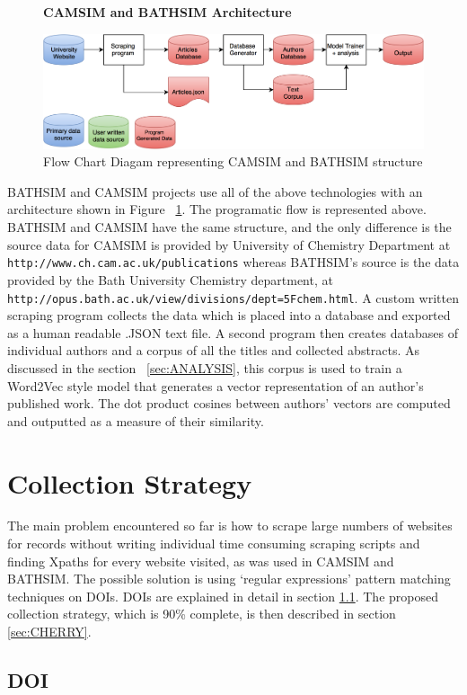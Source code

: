 \documentclass[11pt, oneside]{article}   	%
\begin{document}
\begin{figure}
    \centering
    \textbf{CAMSIM and BATHSIM Architecture}\par\medskip
    \includegraphics[scale=0.23]{CAMSIM.png}
    \caption{Flow Chart Diagam representing CAMSIM and BATHSIM structure \label{fig:CAMSIM}}
\end{figure}

BATHSIM and CAMSIM projects use all of the above technologies with an architecture shown in Figure ~\ref{fig:CAMSIM}. The programatic flow is represented above. BATHSIM and CAMSIM have the same structure, and the only difference is the source data for CAMSIM is provided by University of Chemistry Department at \texttt{ http://www.ch.cam.ac.uk/publications} whereas BATHSIM's source is the data provided by the Bath University Chemistry department, at \texttt{http://opus.bath.ac.uk/view/divisions/dept=5Fchem.html}. A custom written scraping program collects the data which is placed into a database and exported as a human readable .JSON text file. A second program then creates databases of individual authors and a corpus of all the titles and collected abstracts. As discussed in the section ~\ref{sec:ANALYSIS}, this corpus is used to train a Word2Vec style model that generates a vector representation of an author's published work. The dot product cosines between authors' vectors are computed and outputted as a measure of their similarity.
\section{Collection Strategy}
The main problem encountered so far is how to scrape large numbers of websites for records without writing individual time consuming scraping scripts and finding Xpaths for every website visited, as was used in CAMSIM and BATHSIM. The possible solution is using `regular expressions' pattern matching techniques on DOIs. DOIs are explained in detail in section \ref{sec:DOI}. The proposed collection strategy, which is 90\% complete, is then described in section \ref{sec:CHERRY}.
\subsection{DOI}
\label{sec:DOI}
\end{document}
